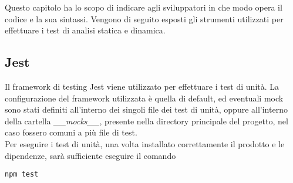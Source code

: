 \documentclass[../manuale_sviluppatore.tex]{subfiles}
\begin{document}
Questo capitolo ha lo scopo di indicare agli sviluppatori in che modo opera il codice e la sua sintassi. 
Vengono di seguito esposti gli strumenti utilizzati per effettuare i test di analisi statica e dinamica.

\subsection{Jest}
Il framework di testing Jest viene utilizzato per effettuare i test di unità. La configurazione del 
framework utilizzata è quella di default, ed eventuali mock sono stati definiti all'interno dei singoli 
file dei test di unità, oppure all'interno della cartella \emph{\_\_mocks\_\_}, presente nella 
directory principale del progetto, nel caso fossero comuni a più file di test.\\

Per eseguire i test di unità, una volta installato correttamente il prodotto e le dipendenze, sarà 
sufficiente eseguire il comando \\
\begin{center}
\verb|npm test|
\end{center}
\end{document}
